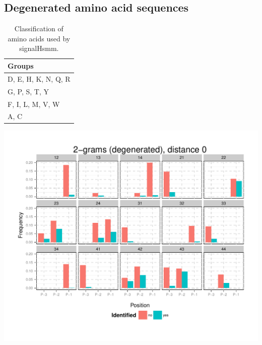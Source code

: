 \documentclass[10pt]{beamer}\usepackage[]{graphicx}\usepackage[]{color}
\makeatletter
\def\maxwidth{ %
  \ifdim\Gin@nat@width>\linewidth
    \linewidth
  \else
    \Gin@nat@width
  \fi
}
\makeatother
\begin{document}
\subsection{Degenerated amino acid sequences}

\begin{frame}
\begin{table}[ht]
\centering
\begin{tabular}{l}
  \hline
Groups \\ 
  \hline
D, E, H, K, N, Q, R \\ 
  G, P, S, T, Y \\ 
  F, I, L, M, V, W \\ 
  A, C \\ 
   \hline
\end{tabular}
\caption{Classification of amino acids used by signalHsmm.} 
\end{table}

\end{frame}


\begin{frame}

\includegraphics[width=\maxwidth]{figure/unnamed-chunk-8-1} 

\end{frame}
\end{document}
